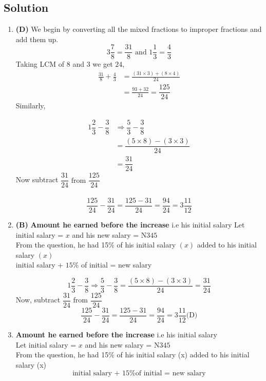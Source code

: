 \subsection{Solution}
\begin{multicols}{2}

\begin{enumerate}[label={\textbf{\arabic*.}}]
    \item \textbf{(D)} We begin by converting all the mixed fractions to improper fractions and add them up. \\
    \[3\dfrac{7}{8} = \dfrac{31}{8} \text { and } 1\dfrac{1}{3} = \dfrac{4}{3}\] 
    Taking LCM of \(8\) and \(3\) we get \(24\),
    \begin{align*}
    \frac{31}{8} + \frac{4}{3} &= \frac{(31 \times 3) + (8 \times 4) }{24} \\
    &= \frac{93 + 32}{24} = \dfrac{125}{24}
    \end{align*}
    Similarly, 

    \begin{align*}
    1\dfrac{2}{3} - \dfrac{3}{8} &\Rightarrow \dfrac{5}{3} - \dfrac{3}{8} \\ 
    &= \dfrac{(5 \times 8) - (3 \times 3)}{24} \\ &= \dfrac{31}{24}
    \end{align*}
    Now subtract  \(\dfrac{31}{24} \text { from } \dfrac{125}{24}\) \\\\
    \[\dfrac{125}{24} - \dfrac{31}{24} = \dfrac{125 - 31}{24} = \dfrac{94}{24} = 3\dfrac{11}{12} \]
    
    \item \textbf{(B)} \textbf{Amount he earned before the increase} i.e his initial salary
    Let initial salary = \(x\) and his new salary = N\(345\)\\
    From the question, he had 15\% of his initial salary $(x)$ added to his initial salary $(x)$ \\
    initial salary + $15\%$ of initial = new salary

    \[1\frac{2}{3} - \frac{3}{8} \Rightarrow \frac{5}{3} - \frac{3}{8} = \frac{(5 \times 8) - (3 \times 3)}{24} = \frac{31}{24}\]
    Now, subtract \(\dfrac{31}{24} \text { from } \dfrac{125}{24}\)
    \[\frac{125}{24} - \frac{31}{24} = \frac{125 - 31}{24} = \frac{94}{24} = 3\frac{11}{12} \text{(D)} \]
    
    \item \textbf{Amount he earned before the increase} i.e his initial salary \\
    Let initial salary = \(x\) and his new salary = N\(345\)\\
    From the question, he had 15\% of his initial salary (x) added to his initial salary (x)
    \[\text{initial salary + 15\% of initial = new salary}\]


\end{enumerate}
\end{multicols}
